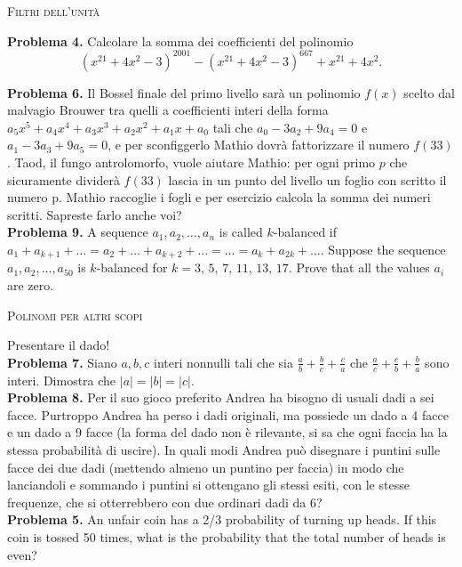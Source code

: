 \documentclass[a4paper]{article}
\theoremstyle{remark}
\theoremstyle{definition}
\begin{document}
\begin{multicols}{2}
	\begin{center}
		\textsc{Filtri dell'unità}
	\end{center}
	
	\textbf{Problema 4.} Calcolare la somma dei coefficienti del polinomio
	\[ (x^{21} + 4x^2 - 3)^{2001} - (x^{21} + 4x^2 - 3)^{667} +x^{21} +4x^2. \]
	
	\textbf{Problema 6.} Il Bossel finale del primo livello sarà un polinomio $ f (x) $ scelto dal malvagio Brouwer tra quelli a coefficienti interi
	della forma $ a_5x^5 + a_4 x^4 + a_3 x^3 + a_2 x^2 + a_1 x + a_0 $ tali che $ a_0 - 3a_2 + 9a_4 = 0 $ e $ a_1 - 3a_3 + 9a_5 = 0 $, e per sconfiggerlo
	Mathio dovrà fattorizzare il numero $ f (33) $. Taod, il fungo antrolomorfo, vuole aiutare Mathio: per ogni primo $ p $ che
	sicuramente dividerà $ f (33) $ lascia in un punto del livello un foglio con scritto il numero p. Mathio raccoglie i fogli e
	per esercizio calcola la somma dei numeri scritti. Sapreste farlo anche voi? \\
	
	\textbf{Problema 9.} A sequence $ a_1, a_2, \dots, a_n $ is called $ k $-balanced if $ a_1 + a_{k+1} + \dots = a_2 + \dots + a_{k+2} + \dots = \dots = 
	a_k +a_{2k} + \dots $. Suppose the sequence $ a_1, a_2, \dots , a_{50} $ is $ k $-balanced for $ k = 3,\, 5,\, 7,\, 11,\, 13,\, 17 $. Prove
	that all the values $ a_i $ are zero. \\
	
	\begin{center}
		\textsc{Polinomi per altri scopi}
	\end{center}
	
	Presentare il dado! \\
	
	\textbf{Problema 7.} Siano $ a, b, c $ interi nonnulli tali che sia $ \frac{a}{b} +\frac{b}{c}+ \frac{c}{a} $ che $ \frac{a}{c} +\frac{c}{b}+ \frac{b}{a} $ sono interi. Dimostra che $ |a| = |b| = |c| $. \\
	
	\textbf{Problema 8.} Per il suo gioco preferito Andrea ha bisogno di usuali dadi a sei facce. Purtroppo Andrea ha perso i dadi originali, ma possiede un dado a 4 facce e un dado a 9 facce (la forma del dado non è rilevante, si sa che ogni faccia ha la stessa probabilità di uscire). In quali modi Andrea può disegnare i puntini sulle facce dei due dadi (mettendo almeno un puntino per faccia) in modo che lanciandoli e sommando i puntini si ottengano gli stessi esiti, con le stesse frequenze, che si otterrebbero con due ordinari dadi da 6? \\
	
	\textbf{Problema 5.} An unfair coin has a 2/3 probability of turning up heads. If this coin is tossed 50 times, what is the probability that the total number of heads is even? \\

	
\end{multicols}
\end{document}
